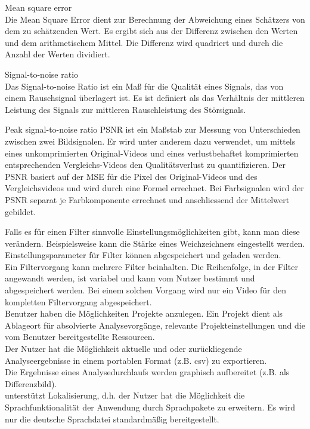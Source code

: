 \begin{compactitem}
\item Mean square error \\
Die Mean Square Error dient zur Berechnung der Abweichung eines Schätzers von dem zu schätzenden Wert. Es ergibt sich aus der Differenz zwischen den Werten und dem arithmetischem Mittel. Die Differenz wird quadriert und durch die Anzahl der Werten dividiert.
\item Signal-to-noise ratio \\
Das Signal-to-noise Ratio ist ein Maß für die Qualität eines Signals, das von einem Rauschsignal überlagert ist. Es ist definiert als das Verhältnis der mittleren Leistung des Signals zur mittleren Rauschleistung des Störsignals.
\item Peak signal-to-noise ratio
PSNR ist ein Maßstab zur Messung von Unterschieden zwischen zwei Bildsignalen. Er wird unter anderem dazu verwendet, um mittels eines unkomprimierten Original-Videos und eines verlustbehaftet komprimierten entsprechenden Vergleichs-Videos den Qualitätsverlust zu quantifizieren. Der PSNR basiert auf der MSE für die Pixel des Original-Videos und des Vergleichsvideos und wird durch eine Formel errechnet. Bei Farbsignalen wird der PSNR separat je Farbkomponente errechnet und anschliessend der Mittelwert gebildet.
\end{compactitem}
 Falls es für einen Filter sinnvolle Einstellungsmöglichkeiten gibt, kann man diese verändern. Beispielsweise kann die Stärke eines Weichzeichners eingestellt werden.\\
 Einstellungsparameter für Filter können abgespeichert und geladen werden.\\
 Ein Filtervorgang kann mehrere Filter beinhalten. Die Reihenfolge, in der Filter angewandt
werden, ist variabel und kann vom Nutzer bestimmt und abgespeichert werden. Bei einem solchen Vorgang wird nur ein Video für den kompletten Filtervorgang abgespeichert.\\
 Benutzer haben die Möglichkeiten Projekte anzulegen. Ein Projekt dient als Ablageort für
absolvierte Analysevorgänge, relevante Projekteinstellungen und die vom Benutzer bereitgestellte Ressourcen.\\
 Der Nutzer hat die Möglichkeit aktuelle und oder zurückliegende Analyseergebnisse in einem portablen Format (z.B. \gls{csv}) zu exportieren.\\
 Die Ergebnisse eines Analysedurchlaufs werden graphisch aufbereitet (z.B. als Differenzbild).\\
 \projektTitel unterstützt Lokalisierung, d.h. der Nutzer hat die Möglichkeit die Sprachfunktionalität der Anwendung durch Sprachpakete zu erweitern. Es wird nur die deutsche Sprachdatei standardmäßig bereitgestellt.

